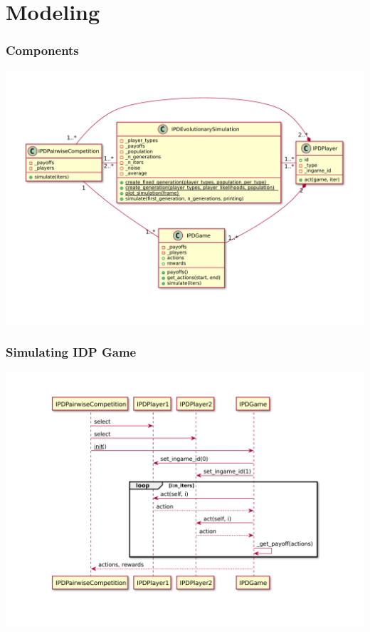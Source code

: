 \documentclass[xcolor={usenames,dvipsnames,svgnames}, compress]{beamer}
\begin{document}
\section{Modeling}
{
  \begin{frame}
    \sectionpage
  \end{frame}
}

\begin{frame}
  \frametitle{Components}
  \begin{center}
    \includegraphics[width=1.0\textwidth]{../uml/class-diagram-full.pdf}
  \end{center}  
\end{frame}

\begin{frame}
  \frametitle{Simulating IDP Game}
  \begin{center}
    \includegraphics[width=1.0\textwidth]{../uml/sequence-competition.pdf}
  \end{center} 
\end{frame}
\end{document}

